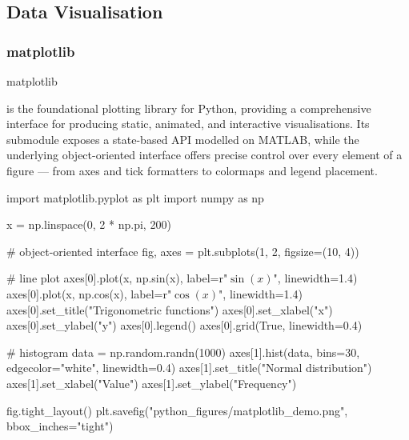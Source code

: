 \documentclass[10pt]{article}
\begin{document}

  \subsection{Data Visualisation}

    \subsubsection{matplotlib}

      \begin{core}[label=core:matplotlib]{matplotlib}

        \href{https://matplotlib.org/stable/api/index.html}{} is the foundational plotting library for Python, providing a comprehensive interface for producing static, animated, and interactive visualisations. Its  submodule exposes a state-based API modelled on MATLAB, while the underlying object-oriented interface offers precise control over every element of a figure — from axes and tick formatters to colormaps and legend placement.

        \begin{pyconsole}

          import matplotlib.pyplot as plt
          import numpy as np

          x = np.linspace(0, 2 * np.pi, 200)

          # object-oriented interface
          fig, axes = plt.subplots(1, 2, figsize=(10, 4))

          # line plot
          axes[0].plot(x, np.sin(x), label=r"$\sin(x)$", linewidth=1.4)
          axes[0].plot(x, np.cos(x), label=r"$\cos(x)$", linewidth=1.4)
          axes[0].set_title("Trigonometric functions")
          axes[0].set_xlabel("x")
          axes[0].set_ylabel("y")
          axes[0].legend()
          axes[0].grid(True, linewidth=0.4)

          # histogram
          data = np.random.randn(1000)
          axes[1].hist(data, bins=30, edgecolor="white", linewidth=0.4)
          axes[1].set_title("Normal distribution")
          axes[1].set_xlabel("Value")
          axes[1].set_ylabel("Frequency")

          fig.tight_layout()
          plt.savefig("python_figures/matplotlib_demo.png", bbox_inches="tight")


\end{pyconsole}
\end{core}
\end{document}
